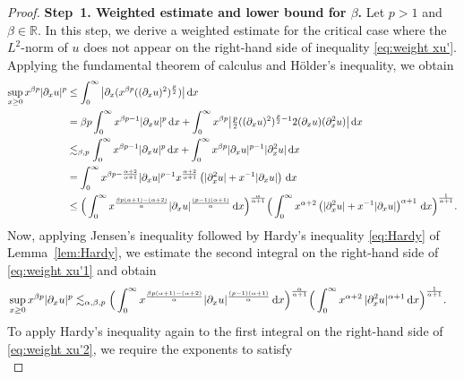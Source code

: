 \documentclass[reqno,12pt]{amsart}
\renewcommand{\d}{\ensuremath{\mathrm{d}}}
\newcommand{\R}{\ensuremath{\mathbb{R}}}
\renewcommand{\d}{\ensuremath{{\rm d}}}
\numberwithin{equation}{section}
\begin{document}
\begin{proof}
\noindent\textbf{Step~1. Weighted estimate and lower bound for \(\beta\).}
%
Let $p>1$ and $\beta \in \R$. In this step, we derive a weighted estimate for the critical case where the $L^2$-norm of $u$ does not appear on the right-hand side of inequality \eqref{eq:weight xu'}. 
%
Applying the fundamental theorem of calculus and H\"older’s inequality, we obtain
%
\begin{align}
\sup_{x \ge 0} x^{\beta p} |\partial_x u|^p &\le \int_0^\infty \big|\partial_x (x^{\beta p} ((\partial_x u)^2)^{\frac p 2})\big| \, \d x \nonumber \\
&= \beta p \int_0^\infty x^{\beta p - 1} |\partial_x u|^p \, \d x + \int_0^\infty x^{\beta p} \big| \tfrac p 2 ((\partial_x u)^2)^{\frac p 2 - 1} 2 (\partial_x u) (\partial_x^2 u)\big| \, \d x \nonumber \\
&\lesssim_{\beta,p} \int_0^\infty x^{\beta p -1} |\partial_x u|^{p}  \, \d x + \int_0^\infty x^{\beta p} |\partial_x u|^{p-1} |\partial_x^2 u| \, \d x \nonumber \\
&= \int_0^\infty x^{\beta p -\frac{\alpha+2}{\alpha +1}} |\partial_x u|^{p-1} x^{\frac{\alpha+2}{\alpha +1}}\left(|\partial_x^2 u| + x^{-1}|\partial_x u|\right)  \, \d x \nonumber \\
& \leq \Big( \int_0^\infty x^{\frac{\beta p (\alpha+1) - (\alpha+2)}{\alpha}} |\partial_x u|^{\frac{(p-1)(\alpha +1)}{\alpha}} \, \d x \Big)^{\frac{\alpha}{\alpha+1}} \Big( \int_0^\infty x^{\alpha+2} \left( |\partial_x^2 u| + x^{-1}|\partial_x u| \right)^{\alpha +1} \, \d x\Big)^{\frac{1}{\alpha +1}}. \label{eq:weight xu'1}
\end{align}
%
Now, applying Jensen’s inequality followed by Hardy’s inequality \eqref{eq:Hardy} of Lemma~\ref{lem:Hardy}, we estimate the second integral on the right-hand side of \eqref{eq:weight xu'1} and obtain
%
\begin{equation}\label{eq:weight xu'2}
\begin{split}
   &\sup_{x \ge 0} x^{\beta p} |\partial_x u|^p \lesssim_{\alpha,\beta,p} \Big( \int_0^\infty x^{\frac{\beta p(\alpha +1) -(\alpha+2)}{\alpha}} |\partial_x u|^{\frac{(p-1)(\alpha +1)}{\alpha}} \, \d x \Big)^{\frac{\alpha}{\alpha+1}}\Big(\int_0^\infty  x^{\alpha+2} \, |\partial_x^2 u|^{\alpha+1} \, \d x\Big)^{\frac{1}{\alpha +1}}.
\end{split}
\end{equation}
%
To apply Hardy’s inequality again to the first integral on the right-hand side of \eqref{eq:weight xu'2}, we require the exponents to satisfy
%
\begin{equation*} 

\end{equation*}
\end{proof}
\end{document}
